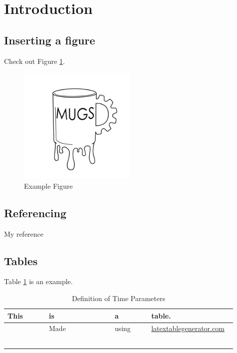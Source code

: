 \documentclass[11pt]{article}
\begin{document}
\section*{\abstractname}

\newpage
\tableofcontents
\newpage
\listoffigures
\listoftables
\newpage
{}
\section*{Introduction}

\subsection{Inserting a figure}
Check out Figure \ref{example}.

\begin{figure}[H]
	\centering
	\includegraphics[width = 0.5\textwidth]{"images/half filled mugs"}
	\caption{Example Figure}
	\label{example}
\end{figure}

\subsection{Referencing}
My reference %


\subsection{Tables}
Table \ref{Table} is an example.

\begin{table}[H]
	\centering
	\raggedright
	\begin{tabular}{ | p{0.17\linewidth} |
			p{0.275\linewidth} |
			p{0.15\linewidth} |
			p{0.35\linewidth} | } 
		\hline
		\textbf{This} & \textbf{is} & \textbf{a}   & \textbf{table.}    \\ \hline
		&Made&using&\url{latextablegenerator.com} \\ \hline
		&&& \\ \hline
		&&& \\ \hline
		&&& \\ \hline
		&&& \\ \hline
		&&& \\ \hline
	\end{tabular}
	\caption{Definition of Time Parameters}
	\label{Table}
\end{table}
\end{document}
